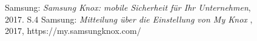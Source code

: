 \documentclass[11pt,a4paper,oneside, 
liststotoc, 					%
bibtotoc,						%
titlepage, 						%
headsepline, 					%
BCOR6mm,						%
]{scrreprt}
\begin{document}
\setcounter{secnumdepth}{3}					%
\setcounter{tocdepth}{3}
\sffamily									%



\tableofcontents							%
\printnomenclature[2.0cm]					%
\listoffigures 								%
\listoftables 								%
\pagebreak

\pagestyle{fancy}					
\rmfamily





%
%




\begin{thebibliography}{999999}

Samsung: \emph{Samsung Knox: mobile Sicherheit für Ihr Unternehmen},\\2017. S.4
Samsung: \emph{Mitteilung über die Einstellung von My Knox },\\2017, https://my.samsungknox.com/

\end{thebibliography}


\begin{appendix}
\clearpage
{}						%
\end{appendix}
\end{document}
